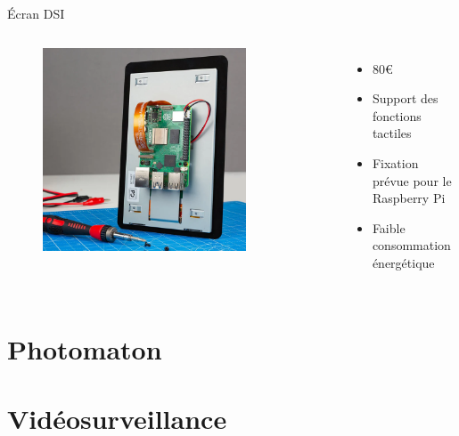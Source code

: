 \documentclass[aspectratio=169,xcolor=dvipsnames]{beamer}
\begin{document}
\begin{frame}{Écran DSI}
    \begin{columns}[c] %

        \begin{figure}
            \includegraphics[width=0.8\textwidth]{images/display-dsi.png}
        \end{figure}

        \begin{itemize}
            \item 80€
            \item Support des fonctions tactiles
            \item Fixation prévue pour le Raspberry Pi
            \item Faible consommation énergétique
        \end{itemize}

    \end{columns}
\end{frame}


\section{Photomaton}
\section{Vidéosurveillance}
\end{document}

